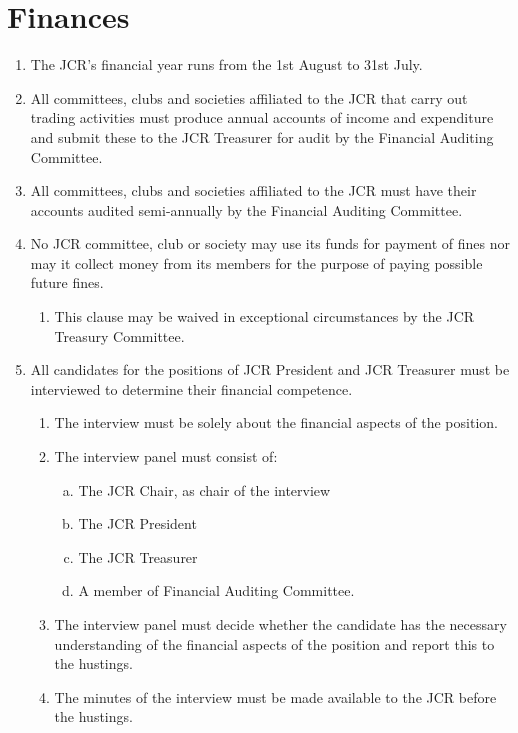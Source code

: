 \documentclass[12pt]{article}  %
\begin{document}
\section{Finances}
\begin{enumerate}
	\item The JCR’s financial year runs from the 1st August to 31st July.
	\item All committees, clubs and societies affiliated to the JCR that carry out trading activities must produce annual accounts of income and expenditure and submit these to the JCR Treasurer for audit by the Financial Auditing Committee.
	\item All committees, clubs and societies affiliated to the JCR must have their accounts audited semi-annually by the Financial Auditing Committee.
	\item No JCR committee, club or society may use its funds for payment of fines nor may it collect money from its members for the purpose of paying possible future fines.
	\begin{enumerate}
		\item This clause may be waived in exceptional circumstances by the JCR Treasury Committee.
	\end{enumerate}
	\item All candidates for the positions of JCR President and JCR Treasurer must be interviewed to determine their financial competence.
	\begin{enumerate}
		\item The interview must be solely about the financial aspects of the position.
		\item The interview panel must consist of:
		\begin{enumerate}[(a)]
			\item The JCR Chair, as chair of the interview
			\item The JCR President
			\item The JCR Treasurer
			\item A member of Financial Auditing Committee.
		\end{enumerate}
		\item The interview panel must decide whether the candidate has the necessary understanding of the financial aspects of the position and report this to the hustings.
		\item The minutes of the interview must be made available to the JCR before the hustings.
	\end{enumerate}

\end{enumerate}
\end{document}
